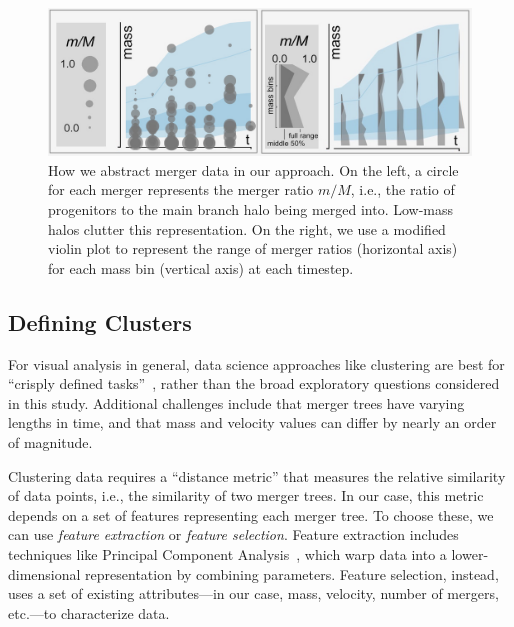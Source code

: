 \begin{figure}[h]
\includegraphics[width=\textwidth]{images/clusters/merger_abstraction_diagram}
\caption{How we abstract merger data in our approach. On the left, a circle for each merger represents the merger ratio $m/M$, i.e., the ratio of progenitors to the main branch halo being merged into. Low-mass halos clutter this representation. On the right, we use a modified violin plot to represent the range of merger ratios (horizontal axis) for each mass bin (vertical axis) at each timestep.}
\label{merger_abstraction}
\end{figure}

\subsection{Defining Clusters}
\label{clustering}

For visual analysis in general, data science approaches like clustering are best for ``crisply defined tasks''~\cite{trenches_stacks}, rather than the broad exploratory questions considered in this study.
Additional challenges include that merger trees have varying lengths in time, and that mass and velocity values can differ by nearly an order of magnitude. 

Clustering data requires a “distance metric” that measures the relative similarity of data points, i.e., the similarity of two merger trees. In our case, this metric depends on a set of features representing each merger tree. To choose these, we can use \textit{feature extraction} or \textit{feature selection}. Feature extraction includes techniques like Principal Component Analysis~\cite{clusteringbook}, which warp data into a lower-dimensional representation by combining parameters. Feature selection, instead, uses a set of existing attributes---in our case, mass, velocity, number of mergers, etc.---to characterize data.

